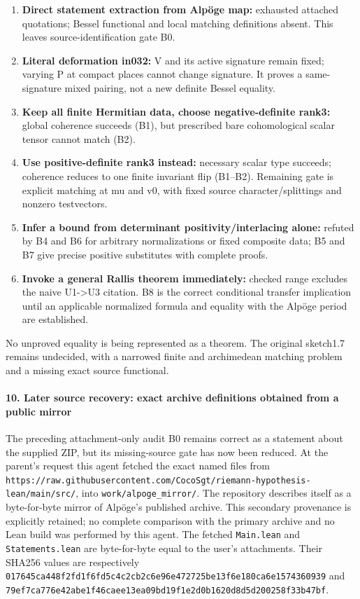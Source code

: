 \begin{enumerate}
\def\labelenumi{\arabic{enumi}.}
\item
  \textbf{Direct statement extraction from Alpöge map:} exhausted attached quotations; Bessel functional and local matching definitions absent. This leaves source-identification gate B0.
\item
  \textbf{Literal deformation in032:} V and its active signature remain fixed; varying P at compact places cannot change signature. It proves a same-signature mixed pairing, not a new definite Bessel equality.
\item
  \textbf{Keep all finite Hermitian data, choose negative-definite rank3:} global coherence succeeds (B1), but prescribed bare cohomological scalar tensor cannot match (B2).
\item
  \textbf{Use positive-definite rank3 instead:} necessary scalar type succeeds; coherence reduces to one finite invariant flip (B1--B2). Remaining gate is explicit matching at mu and v0, with fixed source character/splittings and nonzero testvectors.
\item
  \textbf{Infer a bound from determinant positivity/interlacing alone:} refuted by B4 and B6 for arbitrary normalizations or fixed composite data; B5 and B7 give precise positive substitutes with complete proofs.
\item
  \textbf{Invoke a general Rallis theorem immediately:} checked range excludes the naive U1-\textgreater U3 citation. B8 is the correct conditional transfer implication until an applicable normalized formula and equality with the Alpöge period are established.
\end{enumerate}

No unproved equality is being represented as a theorem. The original sketch1.7 remains undecided, with a narrowed finite and archimedean matching problem and a missing exact source functional.

\paragraph{10. Later source recovery: exact archive definitions obtained from a public mirror}\label{later-source-recovery-exact-archive-definitions-obtained-from-a-public-mirror}

The preceding attachment-only audit B0 remains correct as a statement about the supplied ZIP, but its missing-source gate has now been reduced. At the parent's request this agent fetched the exact named files from \texttt{https://raw.githubusercontent.com/CocoSgt/riemann-hypothesis-lean/main/src/}, into \texttt{work/alpoge\_mirror/}. The repository describes itself as a byte-for-byte mirror of Alpöge's published archive. This secondary provenance is explicitly retained; no complete comparison with the primary archive and no Lean build was performed by this agent. The fetched \texttt{Main.lean} and \texttt{Statements.lean} are byte-for-byte equal to the user's attachments. Their SHA256 values are respectively \texttt{017645ca448f2fd1f6fd5c4c2cb2c6e96e472725be13f6e180ca6e1574360939} and \texttt{79ef7ca776e42abe1f46caee13ea09bd19f1e2d0b1620d8d5d200258f33b47bf}.

